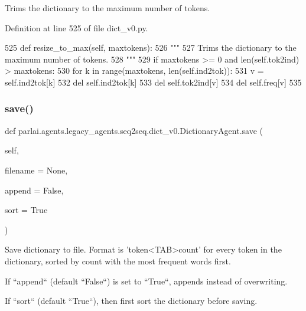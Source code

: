 \begin{DoxyVerb}Trims the dictionary to the maximum number of tokens.
\end{DoxyVerb}
 

Definition at line 525 of file dict\+\_\+v0.\+py.


\begin{DoxyCode}
525     \textcolor{keyword}{def }resize\_to\_max(self, maxtokens):
526         \textcolor{stringliteral}{"""}
527 \textcolor{stringliteral}{        Trims the dictionary to the maximum number of tokens.}
528 \textcolor{stringliteral}{        """}
529         \textcolor{keywordflow}{if} maxtokens >= 0 \textcolor{keywordflow}{and} len(self.tok2ind) > maxtokens:
530             \textcolor{keywordflow}{for} k \textcolor{keywordflow}{in} range(maxtokens, len(self.ind2tok)):
531                 v = self.ind2tok[k]
532                 del self.ind2tok[k]
533                 del self.tok2ind[v]
534                 del self.freq[v]
535 
\end{DoxyCode}
\mbox{\label{classparlai_1_1agents_1_1legacy__agents_1_1seq2seq_1_1dict__v0_1_1DictionaryAgent_ab2838da6f97c13b8eae241ac6db59417}} 
\subsubsection{\texorpdfstring{save()}{save()}}
{\footnotesize\ttfamily def parlai.\+agents.\+legacy\+\_\+agents.\+seq2seq.\+dict\+\_\+v0.\+Dictionary\+Agent.\+save (\begin{DoxyParamCaption}\item[{}]{self,  }\item[{}]{filename = {\ttfamily None},  }\item[{}]{append = {\ttfamily False},  }\item[{}]{sort = {\ttfamily True} }\end{DoxyParamCaption})}

\begin{DoxyVerb}Save dictionary to file. Format is 'token<TAB>count' for every token in the
dictionary, sorted by count with the most frequent words first.

If ``append`` (default ``False``) is set to ``True``, appends instead of
overwriting.

If ``sort`` (default ``True``), then first sort the dictionary before saving.
\end{DoxyVerb}
 

